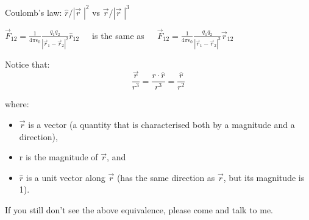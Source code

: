\begin{frame}{Coulomb's law: $\hat{r}/|\vec{r}\;|^2$ vs $\vec{r}/|\vec{r}\;|^3$}

\begin{center}
$\displaystyle \vec{F}_{12} = \frac{1}{4\pi\epsilon_0} \frac{q_1 q_2}{|\vec{r}_{1}-\vec{r}_{2}|^{2}} \hat{r}_{12}$
$\;\;\;$
is the same as
$\;\;\;$
$\displaystyle \vec{F}_{12} = \frac{1}{4\pi\epsilon_0} \frac{q_1 q_2}{|\vec{r}_{1}-\vec{r}_{2}|^{3}} \vec{r}_{12}$\\
\end{center}

\vspace{0.4cm}

Notice that:
\begin{equation*}
   \frac{\vec{r}}{r^3} =
   \frac{r\cdot\hat{r}}{r^3} =
   \frac{\hat{r}}{r^2}
\end{equation*}

where:
\begin{itemize}
  \item $\vec{r}$ is a vector (a quantity that is characterised both by a magnitude and a direction),
  \item r is the magnitude of $\vec{r}$, and
  \item $\hat{r}$ is a unit vector along $\vec{r}$ (has the same direction as $\vec{r}$, but its magnitude is 1).
\end{itemize}

\vspace{0.3cm}

If you still don't see the above equivalence, please come and talk to me.

\end{frame}

%
%
%

